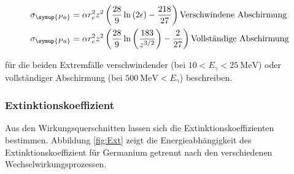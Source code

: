 \begin{align*}
    \sigma_{\symup{Pa}} &= \alpha r_e^2 z^2\left(\frac{28}{9}\ln{\left(2\epsilon\right)}-\frac{218}{27}\right)\textrm{Verschwindene Abschirmung}\\
    \sigma_{\symup{Pa}} &= \alpha r_e^2 z^2\left(\frac{28}{9}\ln{\left(\frac{183}{z^{3/2}}\right)}-\frac{2}{27}\right) \textrm{Vollständige Abschirmung}
\end{align*}

für die beiden Extremfälle verschwindender (bei $10<E_\gamma<\SI{25}{\mega\eV}$) oder vollständiger Abschirmung (bei $\SI{500}{\mega\eV}<E_\gamma$) beschreiben.

\subsubsection{Extinktionskoeffizient}

Aus den Wirkungsquerschnitten lassen sich die Extinktionskoeffizienten bestimmen. Abbildung \ref{fig:Ext} zeigt die Energieabhängigkeit des Extinktionskoeffizient
für Germanium getrennt nach den verschiedenen Wechselwirkungsprozessen.

